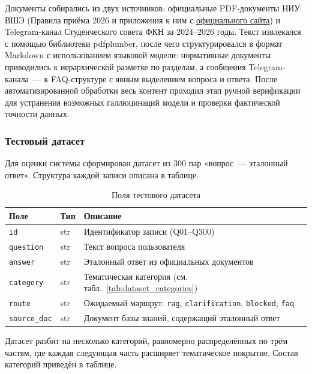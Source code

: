 \documentclass{article}
\begin{document}
\noindent Документы собирались из двух источников: официальные PDF-документы НИУ ВШЭ 
(Правила приёма 2026 и приложения к ним с \href{https://ba.hse.ru}{официального сайта}) и 
Telegram-канал Студенческого совета ФКН за 2024--2026 годы. Текст извлекался 
с помощью библиотеки pdfplumber, после чего структурировался 
в формат Markdown с использованием языковой модели: нормативные 
документы приводились к иерархической разметке по разделам, а сообщения 
Telegram-канала~--- к FAQ-структуре с явным выделением вопроса и ответа. После автоматизированной обработки весь контент проходил этап ручной верификации для устранения возможных галлюцинаций модели и проверки фактической точности данных.



\subsubsection{Тестовый датасет}

Для оценки системы сформирован датасет из 300 пар «вопрос~--- эталонный
ответ». Структура каждой записи описана в таблице.

\begin{table}[h]
\centering
\begin{tabular}{llp{6cm}}
\hline
\textbf{Поле} & \textbf{Тип} & \textbf{Описание} \\
\hline
\texttt{id}         & str  & Идентификатор записи (Q01--Q300) \\
\texttt{question}   & str  & Текст вопроса пользователя \\
\texttt{answer}     & str  & Эталонный ответ из официальных документов \\
\texttt{category}   & str  & Тематическая категория (см. табл.~\ref{tab:dataset_categories}) \\
\texttt{route}      & str  & Ожидаемый маршрут: \texttt{rag}, \texttt{clarification}, \texttt{blocked},  \texttt{faq} \\
\texttt{source\_doc}& str  & Документ базы знаний, содержащий эталонный ответ \\
\hline
\end{tabular}
\caption{Поля тестового датасета}
\label{tab:dataset_fields}
\end{table}

\noindent Датасет разбит на несколько категорий, равномерно распределённых по трём частям, где каждая следующая часть
расширяет тематическое покрытие. Состав категорий приведён в
таблице.
\end{document}

